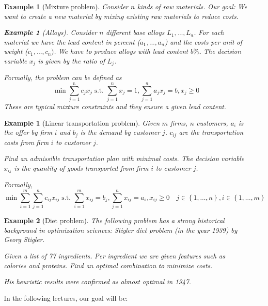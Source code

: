\documentclass[a4paper]{article}
\numberwithin{lecref}{subsection}
\newcounter{exercises}
\newtheorem{example}[exercises]{Example}
\newtheorem*{Example}{Example}
\newcommand{\Set}[1]{\left\{#1\right\}}
\begin{document}
\begin{example}[Mixture problem]
	\label{example:2}
	Consider $n$ kinds of raw materials. Our goal: We want to create a new material by mixing existing raw materials to reduce costs.

	\begin{Example}[Alloys]
		Consider $n$ different base alloys $L_1, \dots, L_n$.
		For each material we have the lead content in percent ($a_1, \dots, a_n$) and the costs per unit of weight ($c_1, \dots, c_n)$.
		We have to produce alloys with lead content $b \%$.
		The decision variable $x_j$ is given by the ratio of $L_j$.

		Formally, the problem can be defined as
		\[ \min{\sum_{j=1}^n c_j x_j} \text{ s.t. } \sum_{j=1}^n x_j = 1, \sum_{j=1}^n a_j x_j = b, x_j \geq 0 \]
		These are typical mixture constraints and they ensure a given lead content.
	\end{Example}
\end{example}

\begin{example}[Linear transportation problem]
  \label{example:3}
  Given $m$ firms, $n$ customers, $a_i$ is the offer by firm $i$ and $b_j$ is the demand by customer $j$.
  $c_{ij}$ are the transportation costs from firm $i$ to customer $j$.

  Find an admissible transportation plan with minimal costs.
  The decision variable $x_{ij}$ is the quantity of goods transported from firm $i$ to customer $j$.

  Formally,
  \[ \min{\sum_{i=1}^m \sum_{j=1}^n c_{ij} x_{ij}} \text{ s.t. } \sum_{i=1}^m x_{ij} = b_j, \sum_{j=1}^n x_{ij} = a_i, x_{ij} \geq 0 \quad j \in \Set{1, \dots, n}, i \in \Set{1, \dots, m} \]
\end{example}

\begin{Example}[Diet problem]
  The following problem has a strong historical background in optimization sciences:
  Stigler diet problem (in the year 1939) by Georg Stigler.

  Given a list of 77 ingredients. Per ingredient we are given features such as calories and proteins.
  Find an optimal combination to minimize costs.

  His heuristic results were confirmed as almost optimal in 1947.
\end{Example}

In the following lectures, our goal will be:
\end{document}

